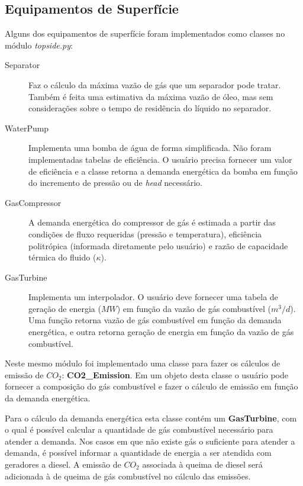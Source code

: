\documentclass[final,5p]{elsarticle}
\numberwithin{equation}{section}
\begin{document}
    \subsection{Equipamentos de Superfície}

        Alguns dos equipamentos de superfície foram implementados como classes no módulo \emph{topside.py}:

        \begin{description}
            \item[Separator] Faz o cálculo da máxima vazão de gás que um separador pode tratar. Também é feita uma estimativa da máxima vazão de óleo, mas sem considerações sobre o tempo de residência do líquido no separador.
            \item[WaterPump] Implementa uma bomba de água de forma simplificada. Não foram implementadas tabelas de eficiência. O usuário precisa fornecer um valor de eficiência e a classe retorna a demanda energética da bomba em função do incremento de pressão ou de \emph{head} necessário.
            \item[GasCompressor] A demanda energética do compressor de gás é estimada a partir das condições de fluxo requeridas (pressão e temperatura), eficiência politrópica (informada diretamente pelo usuário) e razão de capacidade térmica do fluido ($\kappa$).
            \item[GasTurbine] Implementa um interpolador. O usuário deve fornecer uma tabela de geração de energia ($MW$) em função da vazão de gás combustível ($m^3/d$). Uma função retorna vazão de gás combustível em função da demanda energética, e outra retorna geração de energia em função da vazão de gás combustível.
        \end{description}

        Neste mesmo módulo foi implementado uma classe para fazer os cálculos de emissão de $CO_2$: \textbf{CO2\_Emission}. Em um objeto desta classe o usuário pode fornecer a composição do gás combustível e fazer o cálculo de emissão em função da demanda energética\cite{10.7122/151333-MS}.

        Para o cálculo da demanda energética esta classe contém um \textbf{GasTurbine}, com o qual é possível calcular a quantidade de gás combustível necessário para atender a demanda. Nos casos em que não existe gás o suficiente para atender a demanda, é possível informar a quantidade de energia a ser atendida com geradores a diesel. A emissão de $CO_2$ associada à queima de diesel será adicionada à de queima de gás combustível no cálculo das emissões.
\end{document}
